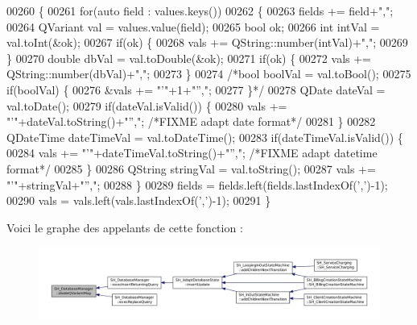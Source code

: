 \begin{DoxyCode}
00260                                                                                              \{
00261     \textcolor{keywordflow}{for}(\textcolor{keyword}{auto} field : values.keys())
00262     \{
00263         fields += field+\textcolor{stringliteral}{","};
00264         QVariant val = values.value(field);
00265         \textcolor{keywordtype}{bool} ok;
00266         \textcolor{keywordtype}{int} intVal = val.toInt(&ok);
00267         \textcolor{keywordflow}{if}(ok) \{
00268             vals += QString::number(intVal)+\textcolor{stringliteral}{","};
00269         \}
00270         \textcolor{keywordtype}{double} dbVal = val.toDouble(&ok);
00271         \textcolor{keywordflow}{if}(ok) \{
00272             vals += QString::number(dbVal)+\textcolor{stringliteral}{","};
00273         \}
00274         \textcolor{comment}{/*bool boolVal = val.toBool();
}
00275 \textcolor{comment}{                if(boolVal) \{
}
00276 \textcolor{comment}{                    &vals += "'"+1+"'',";
}
00277 \textcolor{comment}{                \}*/}
00278         QDate dateVal = val.toDate();
00279         \textcolor{keywordflow}{if}(dateVal.isValid()) \{
00280             vals += \textcolor{stringliteral}{"'"}+dateVal.toString()+\textcolor{stringliteral}{"'',"}; \textcolor{comment}{/*FIXME adapt date format*/}
00281         \}
00282         QDateTime dateTimeVal = val.toDateTime();
00283         \textcolor{keywordflow}{if}(dateTimeVal.isValid()) \{
00284             vals += \textcolor{stringliteral}{"'"}+dateTimeVal.toString()+\textcolor{stringliteral}{"'',"}; \textcolor{comment}{/*FIXME adapt datetime format*/}
00285         \}
00286         QString stringVal = val.toString();
00287         vals += \textcolor{stringliteral}{"'"}+stringVal+\textcolor{stringliteral}{"'',"};
00288     \}
00289     fields = fields.left(fields.lastIndexOf(\textcolor{charliteral}{','})-1);
00290     vals = vals.left(vals.lastIndexOf(\textcolor{charliteral}{','})-1);
00291 \}
\end{DoxyCode}


Voici le graphe des appelants de cette fonction \-:\nopagebreak
\begin{figure}[H]
\begin{center}
\leavevmode
\includegraphics[width=350pt]{classSH__DatabaseManager_acab8936d9c694610eda1c157a405ead3_icgraph}
\end{center}
\end{figure}


